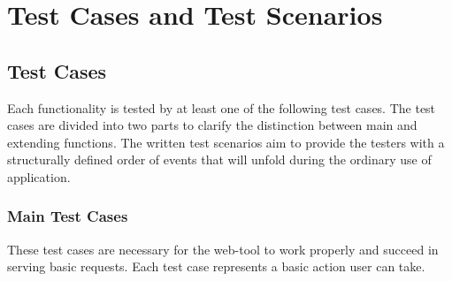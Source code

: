\section{Test Cases and Test Scenarios}
\subsection{Test Cases}
Each functionality is tested by at least one of the following test cases. The test cases are divided into two parts to clarify the distinction between main and extending functions. The written test scenarios aim to provide the testers with a structurally defined order of events that will unfold during the ordinary use of application.
\subsubsection{Main Test Cases}
These test cases are necessary for the web-tool to work properly and succeed in serving
basic requests. Each test case represents a basic action user can take.

